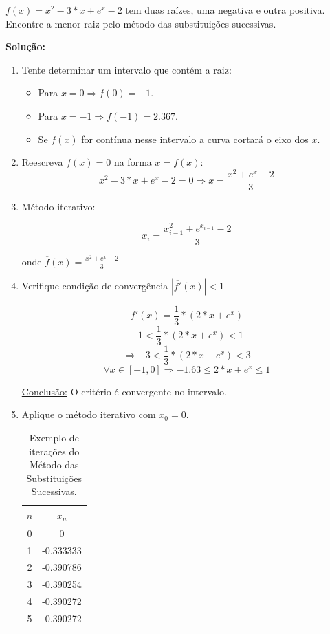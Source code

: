 \begin{example}
\label{ex:substituicoes1}

 $f(x) = x^{2} - 3 \ast x + e^{x} - 2$ tem duas raízes, uma negativa e outra positiva. Encontre a menor raiz pelo método das substituições sucessivas.

\textbf{Solução:}

\begin{enumerate}

\item Tente determinar um intervalo que contém a raiz:

\begin{itemize}
 \item Para $x = 0 \Rightarrow f(0) = -1$.
 \item Para $x = -1 \Rightarrow f(-1) = 2.367$.
 \item Se $f(x)$ for contínua nesse intervalo a curva cortará o eixo dos $x$.
\end{itemize}

\item Reescreva $f(x) = 0$ na forma $x = \overline{f}(x)$:
\[
 x^{2} - 3 \ast x + e^{x} - 2 = 0 \Rightarrow x = \frac{x^{2} + e^{x} -2}{3}
\]

\item Método iterativo:

\[
 x_{i} = \frac{x_{i-1}^{2} + e^{x_{i-1}} -2}{3}
\]

onde $ \displaystyle \overline{f}(x) = \frac{x^{2} + e^{x} -2}{3}$

\item Verifique condição de convergência $|\overline{f'}(x) | < 1$

\[
 \overline{f'}(x) = \frac{1}{3} \ast (2 \ast x + e^{x})
\]
\[
 -1 < \frac{1}{3} \ast (2 \ast x + e^{x}) < 1
\]
\[
 \Rightarrow -3 < \frac{1}{3} \ast (2 \ast x + e^{x}) < 3
\]
\[
 \forall x \in [-1,0] \Rightarrow -1.63 \leq 2 \ast x + e^{x} \leq 1
\]

\underline{Conclusão:} O critério é convergente no intervalo.

\item Aplique o método iterativo com $x_{0} = 0$.

\begin{table}[htp]
\footnotesize
	\centering
		
		\begin{tabular}{|c|c|}
		\hline		
		\textbf{$n$} & \textbf{$x_{n}$}\\
		\hline \hline 
		0 & 0\\
		\hline 
		1 & -0.333333\\
		\hline 
		2 & -0.390786\\
		\hline 
		3 & -0.390254\\
		\hline
		4 & -0.390272\\
		\hline
		5 & -0.390272\\
		\hline
		\end{tabular}
	\caption{Exemplo de iterações do Método das Substituições Sucessivas.}
	\label{tab:sucessivo1}
\end{table}


\end{enumerate}
\end{example}
